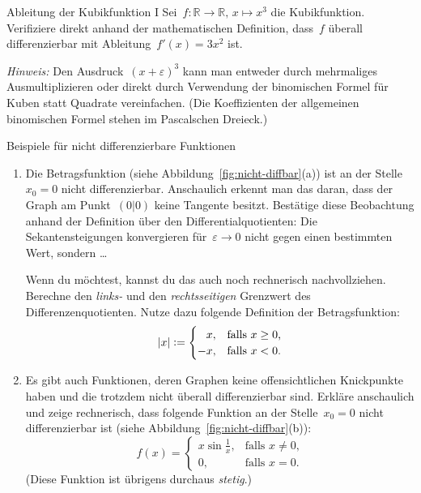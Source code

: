 \documentclass[twoside]{../zirkelblatt}
\newcommand{\RR}{\mathbb{R}}
\newcommand{\defeq}{\vcentcolon=}
\theoremstyle{definition}
\theoremstyle{plain}
\theoremstyle{remark}
\begin{document}
\begin{aufgabeShaded}{Ableitung der Kubikfunktion I}
Sei~$f : \RR \to \RR,\,x \mapsto x^3$ die Kubikfunktion. Verifiziere direkt
anhand der mathematischen Definition, dass~$f$ überall differenzierbar mit
Ableitung~$f'(x) = 3x^2$ ist.

\emph{Hinweis:} Den Ausdruck~$(x + \varepsilon)^3$ kann man entweder durch
mehrmaliges Ausmultiplizieren oder direkt durch Verwendung der binomischen
Formel für Kuben statt Quadrate vereinfachen. (Die Koeffizienten der
allgemeinen binomischen Formel stehen im Pascalschen Dreieck.)
\end{aufgabeShaded}

\begin{aufgabeShaded}{Beispiele für nicht differenzierbare Funktionen}
\label{aufg:nichtdb}
\begin{enumerate}
\item Die Betragsfunktion (siehe Abbildung~\ref{fig:nicht-diffbar}(a)) ist an der
Stelle~$x_0 = 0$ nicht differenzierbar. Anschaulich erkennt man das daran, dass
der Graph am Punkt~$(0|0)$ keine Tangente besitzt.\footnotemark{}
Bestätige diese Beobachtung anhand der Definition über den
Differentialquotienten: Die Sekantensteigungen konvergieren für~$\varepsilon
\to 0$ nicht gegen einen bestimmten Wert, sondern \ldots

Wenn du möchtest, kannst du das auch noch rechnerisch nachvollziehen. Berechne
den \emph{links-} und den \emph{rechtsseitigen} Grenzwert des
Differenzenquotienten. Nutze dazu folgende Definition der Betragsfunktion:
\[ |x| \defeq \begin{cases}\phantom{-}x, & \text{falls $x \geq 0$,} \\ -x, & \text{falls $x <
0$.}\end{cases} \]
\item Es gibt auch Funktionen, deren Graphen keine offensichtlichen
Knickpunkte haben und die trotzdem nicht überall differenzierbar sind. Erkläre
anschaulich und zeige rechnerisch, dass folgende Funktion an der Stelle~$x_0 =
0$ nicht differenzierbar ist (siehe Abbildung~\ref{fig:nicht-diffbar}(b)):
\[ f(x) = \begin{cases}x \sin\frac{1}{x}, & \text{falls $x \neq 0$,} \\
0, & \text{falls $x = 0$.}\end{cases} \]
(Diese Funktion ist übrigens durchaus \emph{stetig}.)
\end{enumerate}
\end{aufgabeShaded}
\end{document}
